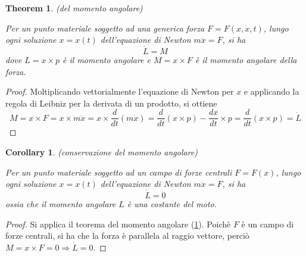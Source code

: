 \documentclass{article}
\newtheorem{theorem}{Theorem}[section]
\newtheorem{corollary}{Corollary}[theorem]
\begin{document}
            \begin{theorem}(del momento angolare)
                \label{thm:momento angolare}

                Per un punto materiale soggetto ad una generica forza $F = F(x, \dot{x}, t)$, lungo ogni soluzione $x = x(t)$ dell'equazione di Newton $m \ddot{x} = F$, si ha
                \[ \dot{L} = M \] dove $L = x \times p$ è il momento angolare e $M = x \times F $ è il momento angolare della forza.
                
            \end{theorem}
            \begin{proof}
                
                Moltiplicando vettorialmente l'equazione di Newton per $x$ e applicando la regola di Leibniz per la derivata di un prodotto, si ottiene
                \[ M = x \times F = x \times m \ddot{x} = x \times \frac{d}{dt}(m\dot{x}) = \frac{d}{dt}(x \times p) - \frac{dx}{dt} \times p = \frac{d}{dt}(x \times p) = \dot{L} \]
           
            \end{proof}

            \begin{corollary}(conservazione del momento angolare)
                \label{cor:conservazione del momento angolare}

                Per un punto materiale soggetto ad un campo di forze centrali $F = F(x)$, lungo ogni soluzione $x = x(t)$ dell'equazione di Newton $m \ddot{x} = F$, si ha
                \[ \dot{L} = 0 \] ossia che il momento angolare $L$ è una costante del moto.

            \end{corollary}
            \begin{proof}

                Si applica il teorema del momento angolare (\ref{thm:momento angolare}). Poichè $F$ è un campo di forze centrali, si ha che la forza è parallela al raggio vettore,
                perciò $ M =  x \times F = 0 \Longrightarrow \dot{L} = 0 $.

            \end{proof}
\end{document}
